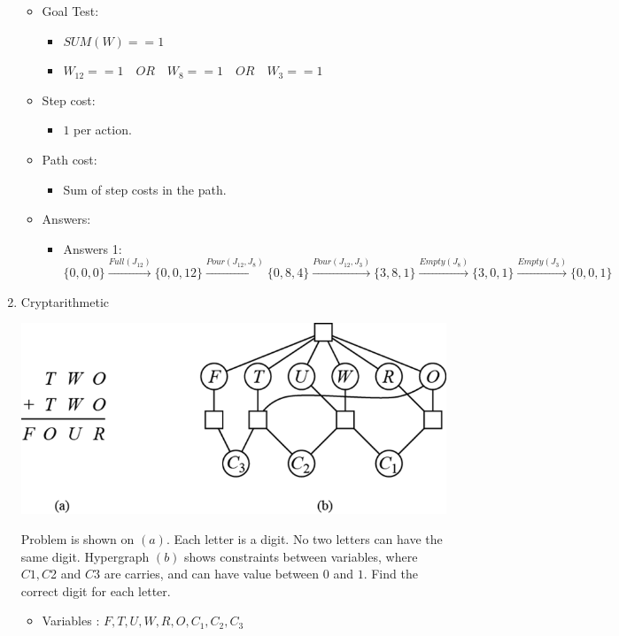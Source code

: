 \documentclass[12pt, a4paper]{article}
\begin{document}
\begin{enumerate}
\begin{itemize}
		\item Goal Test:
		\begin{itemize}
			\item $SUM(W) == 1$
			\item $W_{12} == 1 \quad OR\quad W_{8} == 1 \quad OR\quad W_{3} == 1 $
		\end{itemize}
		\item Step cost:
		\begin{itemize}
			\item $1$ per action.
		\end{itemize}
		\item Path cost:
		\begin{itemize}
			\item Sum of step costs in the path.
		\end{itemize}
		\item Answers:
		\begin{itemize}
			\item Answers 1:\\
			$\{0, 0, 0\} \xrightarrow{Full(J_{12})} \{0, 0, 12\} \xrightarrow{Pour(J_{12}, J_{8})} \{0,8,4\} \xrightarrow{Pour(J_{12}, J_{3})} \{3,8,1\} \xrightarrow{Empty(J_{8})} \{3,0,1\} \xrightarrow{Empty(J_{3})} \{0,0,1\}$ 
		\end{itemize}
		\end{itemize}
	
	\newpage
	\item Cryptarithmetic
	\begin{center}
		\includegraphics[scale=0.8]{Picture1.png}
	\end{center}
	Problem is shown on $(a)$. Each letter is a digit. No two letters can have the same digit. Hypergraph $(b)$ shows constraints between variables, where $C1, C$2 and $C3$ are carries, and can have value between $0$ and $1$. Find the correct digit for each letter.
	\begin{itemize}
		\item Variables : $F, T, U, W, R, O, C_1, C_2, C_3$
		

\end{itemize}
\end{enumerate}
\end{document}

